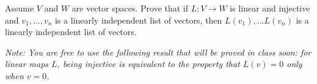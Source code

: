 \begin{question}
	\normalfont
	
Assume $V$ and $W$ are vector spaces. Prove that if $L:V\to W$ is linear and injective and \hspace{.1cm} $v_1,\dots, v_n$ \hspace{.1cm} is a linearly independent list of vectors, then \hspace{.1cm} $L(v_1),\dots L(v_n)$  \hspace{.1cm} is a linearly independent list of vectors.
	
	
\noindent \emph{Note: You are free to use the following result that will be proved in class soon: for linear maps $L$, being injective is equivalent to the property that $L(v)=0$ only when $v=0$.}

\end{question}